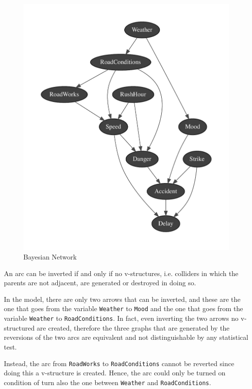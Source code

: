 \documentclass[a4paper,12pt]{article} %
\begin{document}
\begin{figure}[H]
	\centering
	\includegraphics[width=.9\linewidth]{../code/network.pdf}	
	\caption{Bayesian Network}
	\label{fig:net}
\end{figure}

An arc can be inverted if and only if no v-structures, i.e. colliders in which the parents are not adjacent, are generated or destroyed in doing so.
 
In the model, there are only two arrows that can be inverted, and these are the one that goes from the variable \texttt{Weather} to \texttt{Mood} and the one that goes from the variable \texttt{Weather} to \texttt{RoadConditions}.
In fact, even inverting the two arrows no v-structured are created, therefore the three graphs that are generated by the reversions of the two arcs are equivalent and not distinguishable by any statistical test.

Instead, the arc from \texttt{RoadWorks} to \texttt{RoadConditions} cannot be reverted since doing this a v-structure is created. Hence, the arc could only be turned on condition of turn also the one between 
\texttt{Weather} and \texttt{RoadConditions}.
\end{document}
